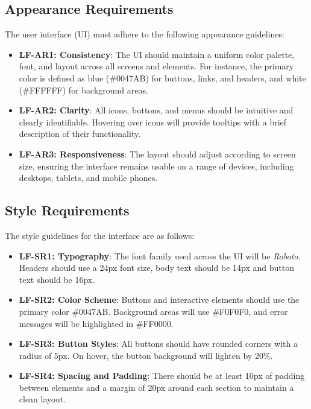 \documentclass[12pt]{article}
\begin{document}
\subsection{Appearance Requirements}
The user interface (UI) must adhere to the following appearance guidelines:
\begin{itemize}
    \item \textbf{LF-AR1: Consistency}: The UI should maintain a uniform color palette, 
    font, and layout across all screens and elements. For instance, the primary 
    color is defined as blue (\#0047AB) for buttons, links, and headers, and 
    white (\#FFFFFF) for background areas.
    
    \item \textbf{LF-AR2: Clarity}: All icons, buttons, and menus should be intuitive and 
    clearly identifiable. Hovering over icons will provide tooltips with a brief 
    description of their functionality.
    
    \item \textbf{LF-AR3: Responsiveness}: The layout should adjust according to screen 
    size, ensuring the interface remains usable on a range of devices, including 
    desktops, tablets, and mobile phones.
\end{itemize}

\subsection{Style Requirements}
The style guidelines for the interface are as follows:
\begin{itemize}
    \item \textbf{LF-SR1: Typography}: The font family used across the UI will be 
    \textit{Roboto}. Headers should use a 24px font size, body text should be 
    14px and button text should be 16px.
    
    \item \textbf{LF-SR2: Color Scheme}: Buttons and interactive elements should use the 
    primary color \#0047AB. Background areas will use \#F0F0F0, and error 
    messages will be highlighted in \#FF0000.
    
    \item \textbf{LF-SR3: Button Styles}: All buttons should have rounded corners with 
    a radius of 5px. On hover, the button background will lighten by 20\%.
    
    \item \textbf{LF-SR4: Spacing and Padding}: There should be at least 10px of padding 
    between elements and a margin of 20px around each section to maintain a clean 
    layout.
\end{itemize}
\end{document}

